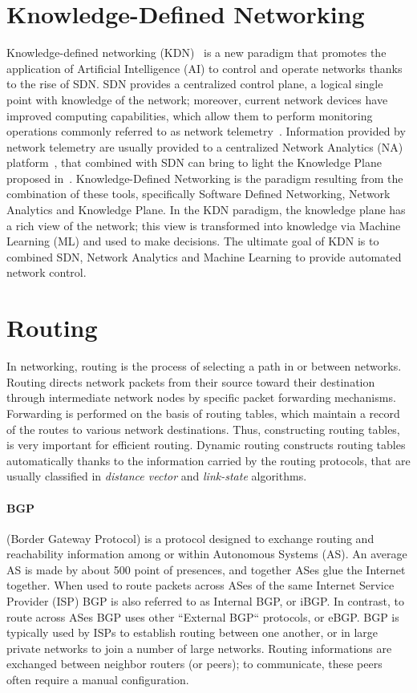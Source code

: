 \section{Knowledge-Defined Networking}
Knowledge-defined networking (KDN)~\cite{mestres2017knowledge} is a new paradigm that promotes the application of Artificial Intelligence (AI) to control and operate networks thanks to the rise of SDN. SDN provides a centralized control plane, a logical single point with knowledge of the network; moreover, current network devices have improved computing capabilities, which allow them to perform monitoring operations commonly referred to as network telemetry~\cite{kim2015band}. Information provided by network telemetry are usually provided to a centralized Network Analytics (NA) platform~\cite{clemm2015dna}, that combined with SDN can bring to light the Knowledge Plane proposed in~\cite{clark2003knowledge}. Knowledge-Defined Networking is the paradigm resulting from the combination of these tools, specifically Software Defined Networking, Network Analytics and Knowledge Plane. In the KDN paradigm, the knowledge plane has a rich view of the network; this view is transformed into knowledge via Machine Learning (ML) and used to make decisions. The ultimate goal of KDN is to combined SDN, Network Analytics  and Machine Learning to provide automated network control.
%
\section{Routing}
In networking, routing is the process of selecting a path in or between networks. Routing directs network packets from their source toward their destination through intermediate network nodes by specific packet forwarding mechanisms. Forwarding is performed on the basis of routing tables, which maintain a record of the routes to various network destinations. Thus, constructing routing tables, is very important for efficient routing. Dynamic routing constructs routing tables automatically thanks to the information carried by the routing protocols, that are usually classified in \textit{distance vector} and \textit{link-state} algorithms.

\paragraph{BGP} (Border Gateway Protocol) is a protocol designed to exchange routing and reachability information among or within Autonomous Systems (AS). An average AS is made by about 500 point of presences, and together ASes glue the Internet together. When used to route packets across ASes of the same Internet Service Provider (ISP) BGP is also referred to as Internal BGP, or iBGP. In contrast, to route across ASes BGP uses other ``External BGP`` protocols, or eBGP. BGP is typically used by ISPs to establish routing between one another, or in large private networks to join a number of large networks. Routing informations are exchanged between neighbor routers (or peers); to communicate, these peers often require a manual configuration.

